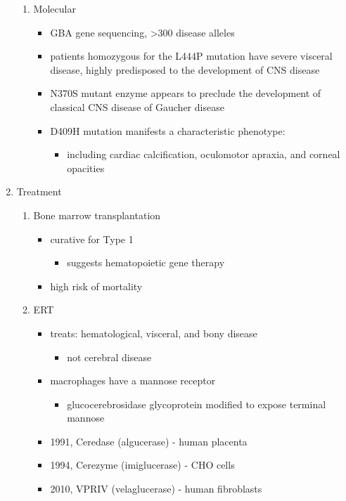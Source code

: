 \documentclass{scrartcl}
\begin{document}
\begin{enumerate}
\begin{enumerate}
\item Molecular
\label{sec:orga6ae518}
\begin{itemize}
\item GBA gene sequencing, >300 disease alleles
\item patients homozygous for the L444P mutation have severe visceral
disease, highly predisposed to the development of CNS disease
\item N370S mutant enzyme appears to preclude the development of classical CNS disease of Gaucher disease
\item D409H mutation manifests a characteristic phenotype:
\begin{itemize}
\item including cardiac calcification, oculomotor apraxia, and corneal opacities
\end{itemize}
\end{itemize}
\end{enumerate}

\item Treatment
\label{sec:org8dbeb01}
\begin{enumerate}
\item Bone marrow transplantation
\label{sec:org569c4bd}
\begin{itemize}
\item curative for Type 1
\begin{itemize}
\item suggests hematopoietic gene therapy
\end{itemize}
\item high risk of mortality
\end{itemize}
\item ERT
\label{sec:org976d254}
\begin{itemize}
\item treats: hematological, visceral, and bony disease
\begin{itemize}
\item not cerebral disease
\end{itemize}
\item macrophages have a mannose receptor
\begin{itemize}
\item glucocerebrosidase glycoprotein modified to expose terminal mannose
\end{itemize}
\item 1991, Ceredase (algucerase) - human placenta
\item 1994, Cerezyme (imiglucerase) - CHO cells
\item 2010, VPRIV (velaglucerase) - human fibroblasts
\end{itemize}


\end{enumerate}
\end{enumerate}
\end{document}
